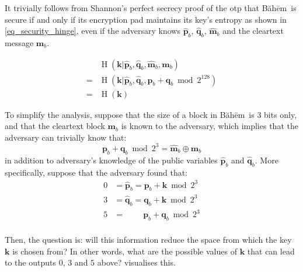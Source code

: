 \documentclass[twocolumn,hidelinks]{article}
\newcommand{\baheem}{Băhēm}
\DeclareMathOperator{\entropy}{H}
\begin{document}
It trivially follows from Shannon's perfect secrecy proof of the \gls{otp}
\cite{perfect_secrecy} that \baheem\ is secure if and only if its
encryption pad maintains its key's entropy as shown in
\cref{eq_security_hinge}, even if the adversary knows $\mathbf{\hat p}_b$,
$\mathbf{\hat q}_b$, $\mathbf{\hat m}_b$ and the cleartext message
$\mathbf{m}_b$.

\begin{equation}
    \begin{split}
        &\entropy(
            \mathbf{k}
            | \mathbf{\hat p}_b,
              \mathbf{\hat q}_b,
              \mathbf{\hat m}_b,
              \mathbf{m}_b
        ) \\
        =&\entropy(
            \mathbf{k}
            | \mathbf{\hat p}_b,
              \mathbf{\hat q}_b,
              \mathbf{p}_b + \mathbf{q}_b \bmod{2^{128}}
        ) \\
        =&\entropy(\mathbf{k})
    \end{split}
    \label{eq_security_hinge}
\end{equation}

To simplify the analysis, suppose that the size of a block in \baheem\ is
$3$ bits only, and that the cleartext block $\mathbf{m}_b$ is known to the
adversary, which implies that the adversary can trivially know that:
\[
    \mathbf{p}_b + \mathbf{q}_b \bmod{2^3}
    = \mathbf{\hat m}_b \oplus \mathbf{m}_b
\]
in addition to adversary's knowledge of the public variables $\mathbf{\hat
p}_b$ and $\mathbf{\hat q}_b$. More specifically, suppose that the
adversary found that:
\begin{align*}
    0&=\mathbf{\hat p}_b = \mathbf{p}_b + \mathbf{k} \bmod{2^3}  \\
    3&=\mathbf{\hat q}_b = \mathbf{q}_b + \mathbf{k} \bmod{2^3}  \\
    5&=\qquad\             \mathbf{p}_b + \mathbf{q}_b \bmod{2^3}\\
\end{align*}

Then, the question is:  will this information reduce the space from which
the key $\mathbf{k}$ is chosen from?  In other words, what are the possible
values of $\mathbf{k}$ that can lead to the outputs $0$, $3$ and $5$ above?
 visualises this.
\end{document}
